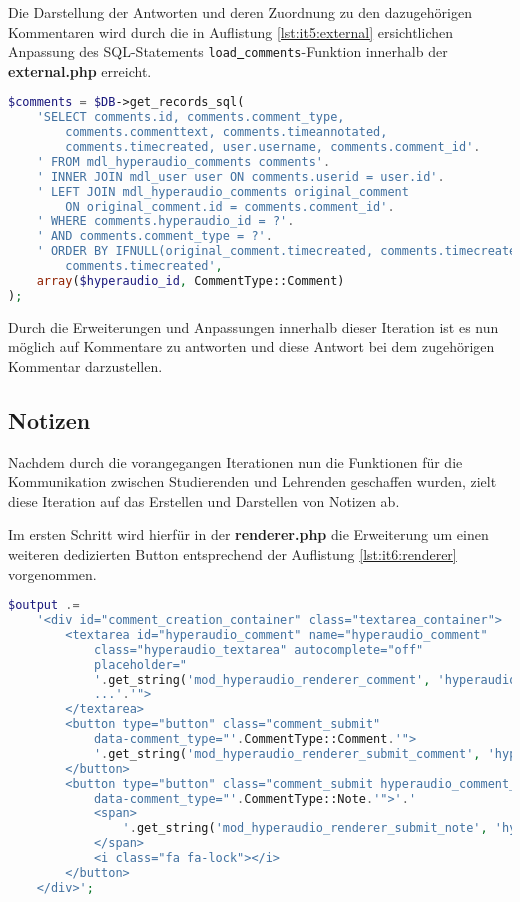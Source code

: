 Die Darstellung der Antworten und deren Zuordnung zu den dazugehörigen Kommentaren wird durch die in Auflistung \ref{lst:it5:external} ersichtlichen Anpassung des SQL-Statements \texttt{load\underline{{ }}comments}-Funktion innerhalb der \textbf{external.php} erreicht.

\begin{lstlisting}[language=php,
             linewidth=\textwidth,
             caption={Ausschnitt der \textbf{external.php} in der 5. Iteration},
             label={lst:it5:external}]
$comments = $DB->get_records_sql(
    'SELECT comments.id, comments.comment_type,
	    comments.commenttext, comments.timeannotated,
	    comments.timecreated, user.username, comments.comment_id'.
    ' FROM mdl_hyperaudio_comments comments'.
    ' INNER JOIN mdl_user user ON comments.userid = user.id'.
    ' LEFT JOIN mdl_hyperaudio_comments original_comment
        ON original_comment.id = comments.comment_id'.
    ' WHERE comments.hyperaudio_id = ?'.
    ' AND comments.comment_type = ?'.
    ' ORDER BY IFNULL(original_comment.timecreated, comments.timecreated),
        comments.timecreated',
	array($hyperaudio_id, CommentType::Comment)
);
\end{lstlisting}

Durch die Erweiterungen und Anpassungen innerhalb dieser Iteration ist es nun möglich auf Kommentare zu antworten und diese Antwort bei dem zugehörigen Kommentar darzustellen.

\subsection{Notizen}
\label{sub:notizen}
Nachdem durch die vorangegangen Iterationen nun die Funktionen für die Kommunikation zwischen Studierenden und Lehrenden geschaffen wurden, zielt diese Iteration auf das Erstellen und Darstellen von Notizen ab.

Im ersten Schritt wird hierfür in der \textbf{renderer.php} die Erweiterung um einen weiteren dedizierten Button entsprechend der Auflistung \ref{lst:it6:renderer} vorgenommen.

\begin{lstlisting}[language=php,
             linewidth=\textwidth,
             caption={Ausschnitt der \textbf{renderer.php} in der 6. Iteration},
             label={lst:it6:renderer}]
$output .=
    '<div id="comment_creation_container" class="textarea_container">
        <textarea id="hyperaudio_comment" name="hyperaudio_comment"
            class="hyperaudio_textarea" autocomplete="off"
            placeholder="
            '.get_string('mod_hyperaudio_renderer_comment', 'hyperaudio').'
            ...'.'">
        </textarea>
        <button type="button" class="comment_submit"
            data-comment_type="'.CommentType::Comment.'">
            '.get_string('mod_hyperaudio_renderer_submit_comment', 'hyperaudio').'
        </button>
        <button type="button" class="comment_submit hyperaudio_comment_button"
            data-comment_type="'.CommentType::Note.'">'.'
            <span>
                '.get_string('mod_hyperaudio_renderer_submit_note', 'hyperaudio').'
            </span>
            <i class="fa fa-lock"></i>
        </button>
    </div>';
\end{lstlisting}

